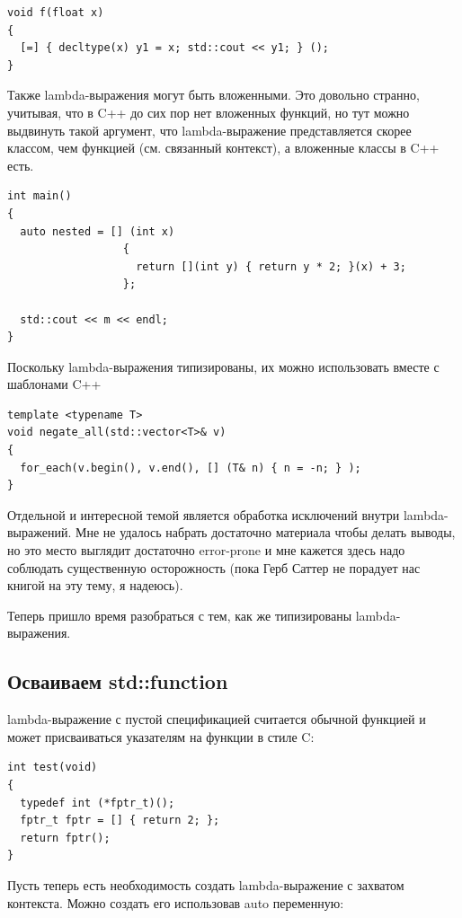 \documentclass[a4paper,12pt,oneside]{article}
\begin{document}
\begin{lstlisting}
void f(float x) 
{
  [=] { decltype(x) y1 = x; std::cout << y1; } ();
}
\end{lstlisting}

Также lambda-выражения могут быть вложенными. Это довольно странно, учитывая, что в C++ до сих пор нет вложенных функций, но тут можно выдвинуть такой аргумент, что lambda-выражение представляется скорее классом, чем функцией (см. связанный контекст), а вложенные классы в C++ есть.

\begin{lstlisting}
int main()
{
  auto nested = [] (int x) 
                  { 
                    return [](int y) { return y * 2; }(x) + 3; 
                  };

  std::cout << m << endl;
}
\end{lstlisting}

Поскольку lambda-выражения типизированы, их можно использовать вместе с шаблонами C++

\begin{lstlisting}
template <typename T> 
void negate_all(std::vector<T>& v)
{
  for_each(v.begin(), v.end(), [] (T& n) { n = -n; } );
}
\end{lstlisting}

Отдельной и интересной темой является обработка исключений внутри lambda-выражений. Мне не удалось набрать достаточно материала чтобы делать выводы, но это место выглядит достаточно error-prone и мне кажется здесь надо соблюдать существенную осторожность (пока Герб Саттер не порадует нас книгой на эту тему, я надеюсь).

Теперь пришло время разобраться с тем, как же типизированы lambda-выражения.

\subsection{Осваиваем std::function}

lambda-выражение с пустой спецификацией считается обычной функцией и может присваиваться указателям на функции в стиле C:

\begin{lstlisting}
int test(void)
{
  typedef int (*fptr_t)();
  fptr_t fptr = [] { return 2; };
  return fptr();
}
\end{lstlisting}

Пусть теперь есть необходимость создать lambda-выражение с захватом контекста. Можно создать его использовав auto переменную:
\end{document}
